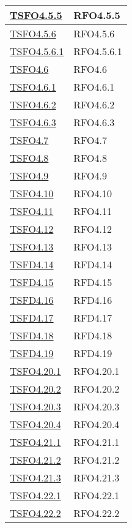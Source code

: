 \begin{longtable}{|>{\centering}m{5cm}|m{5cm}<{\centering}|}
\hyperlink{TSFO4.5.5}{TSFO4.5.5} & RFO4.5.5\\ \hline
\hyperlink{TSFO4.5.6}{TSFO4.5.6} & RFO4.5.6\\ \hline
\hyperlink{TSFO4.5.6.1}{TSFO4.5.6.1} & RFO4.5.6.1\\ \hline
\hyperlink{TSFO4.6}{TSFO4.6} & RFO4.6\\ \hline
\hyperlink{TSFO4.6.1}{TSFO4.6.1} & RFO4.6.1\\ \hline
\hyperlink{TSFO4.6.2}{TSFO4.6.2} & RFO4.6.2\\ \hline
\hyperlink{TSFO4.6.3}{TSFO4.6.3} & RFO4.6.3\\ \hline
\hyperlink{TSFO4.7}{TSFO4.7} & RFO4.7\\ \hline
\hyperlink{TSFO4.8}{TSFO4.8} & RFO4.8\\ \hline
\hyperlink{TSFO4.9}{TSFO4.9} & RFO4.9\\ \hline
\hyperlink{TSFO4.10}{TSFO4.10} & RFO4.10\\ \hline
\hyperlink{TSFO4.11}{TSFO4.11} & RFO4.11\\ \hline
\hyperlink{TSFO4.12}{TSFO4.12} & RFO4.12\\ \hline
\hyperlink{TSFO4.13}{TSFO4.13} & RFO4.13\\ \hline
\hyperlink{TSFD4.14}{TSFD4.14} & RFD4.14\\ \hline
\hyperlink{TSFD4.15}{TSFD4.15} & RFD4.15\\ \hline
\hyperlink{TSFD4.16}{TSFD4.16} & RFD4.16\\ \hline
\hyperlink{TSFD4.17}{TSFD4.17} & RFD4.17\\ \hline
\hyperlink{TSFD4.18}{TSFD4.18} & RFD4.18\\ \hline
\hyperlink{TSFD4.19}{TSFD4.19} & RFD4.19\\ \hline
\hyperlink{TSFO4.20.1}{TSFO4.20.1} & RFO4.20.1\\ \hline
\hyperlink{TSFO4.20.2}{TSFO4.20.2} & RFO4.20.2\\ \hline
\hyperlink{TSFO4.20.3}{TSFO4.20.3} & RFO4.20.3\\ \hline
\hyperlink{TSFO4.20.4}{TSFO4.20.4} & RFO4.20.4\\ \hline
\hyperlink{TSFO4.21.1}{TSFO4.21.1} & RFO4.21.1\\ \hline
\hyperlink{TSFO4.21.2}{TSFO4.21.2} & RFO4.21.2\\ \hline
\hyperlink{TSFO4.21.3}{TSFO4.21.3} & RFO4.21.3\\ \hline
\hyperlink{TSFO4.22.1}{TSFO4.22.1} & RFO4.22.1\\ \hline
\hyperlink{TSFO4.22.2}{TSFO4.22.2} & RFO4.22.2\\ \hline

\end{longtable}
